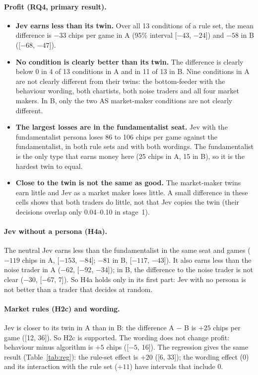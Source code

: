 \paragraph{Profit (RQ4, primary result).}
\begin{itemize}
\item \textbf{Jev earns less than its twin.} Over all 13 conditions of a rule set, the mean difference is
$-33$ chips per game in A (95\% interval [$-43$, $-24$]) and $-58$ in B ([$-68$, $-47$]).
\item \textbf{No condition is clearly better than its twin.} The difference is clearly below 0 in 4 of 13 conditions in
A and in 11 of 13 in B. Nine conditions in A are not clearly different from their twins: the bottom-feeder with the
behaviour wording, both chartists, both noise traders and all four market makers. In B, only
the two AS market-maker conditions are not clearly different.
\item \textbf{The largest losses are in the fundamentalist seat.} Jev with the fundamentalist persona loses 86 to 106
chips per game against the fundamentalist, in both rule sets and with both wordings. The fundamentalist is the only type
that earns money here (25 chips in A, 15 in B), so it is the hardest twin to equal.
\item \textbf{Close to the twin is not the same as good.} The market-maker twins earn little and Jev as a market maker
loses little. A small difference in these cells shows that both traders do little, not that Jev copies the twin
(their decisions overlap only 0.04--0.10 in stage~1).
\end{itemize}

\paragraph{Jev without a persona (H4a).} The neutral Jev earns less than the fundamentalist in the same seat and games
($-119$ chips in A, [$-153$, $-84$]; $-81$ in B, [$-117$, $-43$]). It also earns less than the noise trader in A
($-62$, [$-92$, $-34$]); in B, the difference to the noise trader is not clear ($-30$, [$-67$, 7]). So H4a holds only
in its first part: Jev with no persona is not better than a trader that decides at random.

\paragraph{Market rules (H2c) and wording.} Jev is closer to its twin in A than in B: the difference A $-$ B is
$+25$ chips per game ([12, 36]). So H2c is supported. The wording does not change profit: behaviour minus
algorithm is $+5$ chips ([$-5$, 16]). The regression gives the same result (Table~\ref{tab:reg}): the rule-set effect
is $+20$ ([6, 33]); the wording effect ($0$) and its interaction with the rule set ($+11$) have intervals that
include 0.

